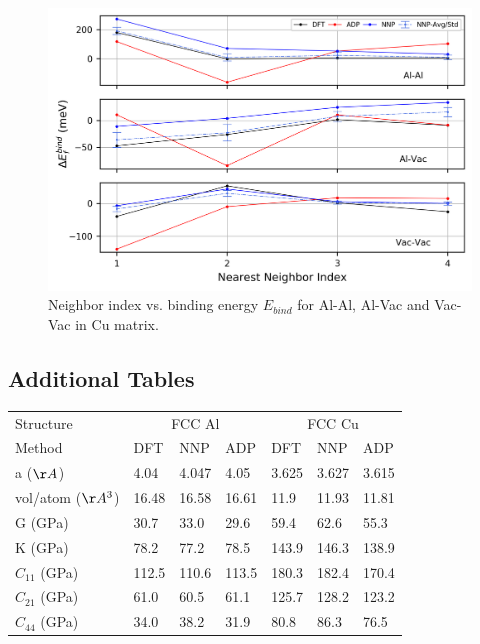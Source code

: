 \documentclass{article}
\begin{document}
\begin{figure}[H]%
\centering%
\includegraphics[width=1\textwidth,center]{./figures/solsol_in_cu.png}%
\caption{Neighbor index vs. binding energy $E_{bind}$ for Al-Al, Al-Vac and Vac-Vac in Cu matrix.}%
\label{fig:solsol_in_cu}
\end{figure}



\subsection{Additional Tables} \label{sct:adn_solsol}
\begin{tabular}{l|lll|lll}%
\hline%
Structure&\multicolumn{3}{c}{FCC Al}&\multicolumn{3}{c}{FCC Cu}\\%
Method&DFT&NNP&ADP&DFT&NNP&ADP\\%
\hline%
a ($\AA$)&4.04&4.047&4.05&3.625&3.627&3.615\\%
vol/atom ($\AA^3$)&16.48&16.58&16.61&11.9&11.93&11.81\\%
G (GPa)&30.7&33.0&29.6&59.4&62.6&55.3\\%
K (GPa)&78.2&77.2&78.5&143.9&146.3&138.9\\%
$C_{11}$ (GPa)&112.5&110.6&113.5&180.3&182.4&170.4\\%
$C_{21}$ (GPa)&61.0&60.5&61.1&125.7&128.2&123.2\\%
$C_{44}$ (GPa)&34.0&38.2&31.9&80.8&86.3&76.5\\%
\hline%
\end{tabular}%
\newline%
\newline%
\newline%
\newline%
\end{document}
